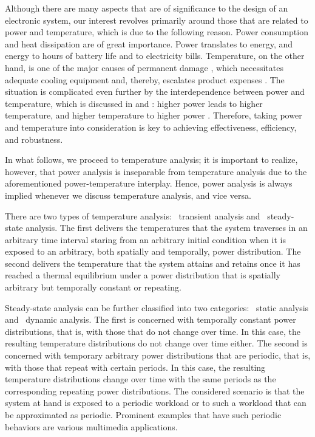 Although there are many aspects that are of significance to the design of an
electronic system, our interest revolves primarily around those that are related
to power and temperature, which is due to the following reason. Power
consumption and heat dissipation are of great importance. Power translates to
energy, and energy to hours of battery life and to electricity bills.
Temperature, on the other hand, is one of the major causes of permanent damage
\cite{jedec2016}, which necessitates adequate cooling equipment and, thereby,
escalates product expenses \cite{chaudhry2015}. The situation is complicated
even further by the interdependence between power and temperature, which is
discussed in  and : higher
power leads to higher temperature, and higher temperature to higher power
\cite{liu2007}. Therefore, taking power and temperature into consideration is
key to achieving effectiveness, efficiency, and robustness.

In what follows, we proceed to temperature analysis; it is important to realize,
however, that power analysis is inseparable from temperature analysis due to the
aforementioned power-temperature interplay. Hence, power analysis is always
implied whenever we discuss temperature analysis, and vice versa.

There are two types of temperature analysis: \one~transient analysis and
\two~steady-state analysis. The first delivers the temperatures that the system
traverses in an arbitrary time interval staring from an arbitrary initial
condition when it is exposed to an arbitrary, both spatially and temporally,
power distribution. The second delivers the temperature that the system attains
and retains once it has reached a thermal equilibrium under a power distribution
that is spatially arbitrary but temporally constant or repeating.

Steady-state analysis can be further classified into two categories: \one~static
analysis and \two~dynamic analysis. The first is concerned with temporally
constant power distributions, that is, with those that do not change over time.
In this case, the resulting temperature distributions do not change over time
either. The second is concerned with temporary arbitrary power distributions
that are periodic, that is, with those that repeat with certain periods. In this
case, the resulting temperature distributions change over time with the same
periods as the corresponding repeating power distributions. The considered
scenario is that the system at hand is exposed to a periodic workload or to such
a workload that can be approximated as periodic. Prominent examples that have
such periodic behaviors are various multimedia applications.
